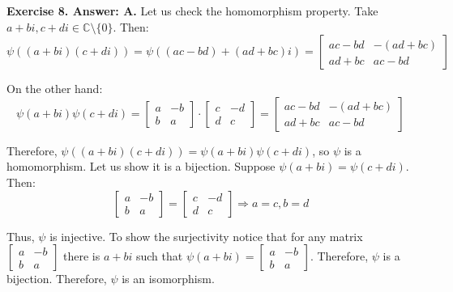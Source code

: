 \documentclass[../../book]{subfiles}
\begin{document}
\textbf{Exercise 8. Answer: A.} Let us check the homomorphism property. Take 
$a+bi,c+di \in \mathbb{C} \setminus \{0\}$. Then:
\begin{equation*}
    \psi((a+bi)(c+di)) = \psi((ac-bd)+(ad+bc)i) = \begin{bmatrix}
        ac-bd & -(ad+bc) \\ ad+bc & ac-bd
    \end{bmatrix}
\end{equation*}

On the other hand:
\begin{equation*}
    \psi(a+bi)\psi(c+di) = \begin{bmatrix}
        a & -b \\ b & a
    \end{bmatrix}\cdot \begin{bmatrix}
        c & -d \\ d & c
    \end{bmatrix} = \begin{bmatrix}
        ac-bd & -(ad+bc) \\ ad+bc & ac-bd
    \end{bmatrix}
\end{equation*}

Therefore, $\psi((a+bi)(c+di))=\psi(a+bi)\psi(c+di)$, so $\psi$ is a homomorphism.
Let us show it is a bijection. Suppose $\psi(a+bi)=\psi(c+di)$. Then:
\begin{equation*}
    \begin{bmatrix}
        a & -b \\ b & a
    \end{bmatrix} = \begin{bmatrix}
        c & -d \\ d & c
    \end{bmatrix} \Rightarrow a=c, b=d
\end{equation*}

Thus, $\psi$ is injective. To show the surjectivity notice that for any matrix
$\begin{bmatrix} a & -b \\ b & a \end{bmatrix}$ there is $a+bi$ such that
$\psi(a+bi)=\begin{bmatrix} a & -b \\ b & a \end{bmatrix}$. Therefore, $\psi$ is
a bijection. Therefore, $\psi$ is an isomorphism.
\end{document}
